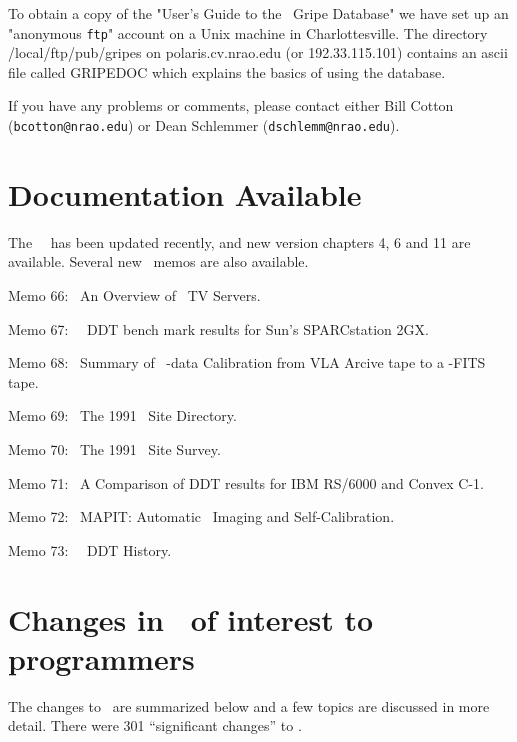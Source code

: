 To obtain a copy of the "User's Guide to the \AIPS\ Gripe Database" we have set
up an "anonymous {\tt ftp}" account on a Unix machine in Charlottesville. The
directory /local/ftp/pub/gripes on polaris.cv.nrao.edu (or 192.33.115.101)
contains an ascii file called GRIPEDOC which explains the basics of using the
database.

If you have any problems or comments, please contact either Bill Cotton
({\tt bcotton@nrao.edu}) or Dean Schlemmer ({\tt dschlemm@nrao.edu}).

\section{Documentation Available}
The \AIPS\ \Cookbook\ has been updated recently, and new
version chapters 4, 6 and 11 are available.
Several new \AIPS\ memos are also available.
\tablestyle
\begin{description}
\item{Memo 66:~} An Overview of \AIPS\ TV Servers.
\item{Memo 67:~} \AIPS\ DDT bench mark results for Sun's SPARCstation 2GX.
\item{Memo 68:~} Summary of \AIPS\ \Uv-data Calibration from VLA Arcive tape
to a \Uv-FITS tape.
\item{Memo 69:~} The 1991 \AIPS\ Site Directory.
\item{Memo 70:~} The 1991 \AIPS\ Site Survey.
\item{Memo 71:~} A Comparison of DDT results for IBM RS/6000 and Convex C-1.
\item{Memo 72:~} MAPIT: Automatic \AIPS\ Imaging and Self-Calibration.
\item{Memo 73:~} \AIPS\ DDT History.
\end{description}

\normalstyle

\section{Changes in \RELEASENAME\ of interest to programmers}
The changes to \RELEASENAME\ are summarized below and a few topics are
discussed in more detail.
There were 301 ``significant changes'' to \RELEASENAME.

